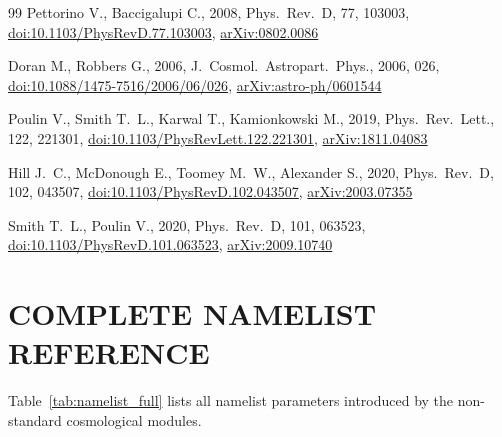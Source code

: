\documentclass[fleqn,usenatbib]{mnras}
\begin{document}
\begin{thebibliography}{99}
Pettorino V., Baccigalupi C., 2008, Phys.\ Rev.\ D, 77, 103003,
\href{https://doi.org/10.1103/PhysRevD.77.103003}{doi:10.1103/PhysRevD.77.103003},
\href{https://arxiv.org/abs/0802.0086}{arXiv:0802.0086}


Doran M., Robbers G., 2006, J.\ Cosmol.\ Astropart.\ Phys., 2006, 026,
\href{https://doi.org/10.1088/1475-7516/2006/06/026}{doi:10.1088/1475-7516/2006/06/026},
\href{https://arxiv.org/abs/astro-ph/0601544}{arXiv:astro-ph/0601544}

Poulin V., Smith T.~L., Karwal T., Kamionkowski M., 2019, Phys.\ Rev.\ Lett., 122, 221301,
\href{https://doi.org/10.1103/PhysRevLett.122.221301}{doi:10.1103/PhysRevLett.122.221301},
\href{https://arxiv.org/abs/1811.04083}{arXiv:1811.04083}

Hill J.~C., McDonough E., Toomey M.~W., Alexander S., 2020, Phys.\ Rev.\ D, 102, 043507,
\href{https://doi.org/10.1103/PhysRevD.102.043507}{doi:10.1103/PhysRevD.102.043507},
\href{https://arxiv.org/abs/2003.07355}{arXiv:2003.07355}

Smith T.~L., Poulin V., 2020, Phys.\ Rev.\ D, 101, 063523,
\href{https://doi.org/10.1103/PhysRevD.101.063523}{doi:10.1103/PhysRevD.101.063523},
\href{https://arxiv.org/abs/2009.10740}{arXiv:2009.10740}

\end{thebibliography}


\appendix

\section{COMPLETE NAMELIST REFERENCE}
\label{app:namelist}

Table~\ref{tab:namelist_full} lists all namelist parameters introduced
by the non-standard cosmological modules.
\end{document}
